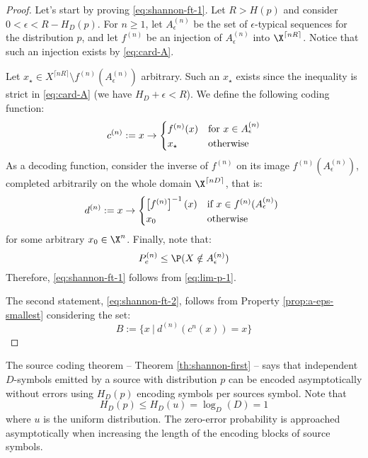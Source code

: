 \documentclass[toc]{../cs-classes/cs-classes}
\begin{document}
\begin{proof}
    Let's start by proving \eqref{eq:shannon-ft-1}. Let $R>H(p)$ and consider $0<\epsilon<R-H_D(p)$. For $n\geq1$, let $A_\epsilon^{(n)}$ be the set of $\epsilon$-typical sequences for the distribution $p$, and let $f^{(n)}$ be an injection of $A_\epsilon^{(n)}$ into $\X^{\lceil nR\rceil}$. Notice that such an injection exists by \eqref{eq:card-A}.

    Let $x_\star\in X^{\lceil nR\rceil}\setminus f^{(n)}(A_\epsilon^{(n)})$ arbitrary. Such an $x_\star$ exists since the inequality is strict in \eqref{eq:card-A} (we have $H_D+\epsilon<R$). We define the following coding function:
    \begin{equation*}
        c^{(n)}:=x\to \begin{cases*}
            f^{(n)}(x) & for $x\in A_\epsilon^{(n)}$\\
            x_\star & otherwise
        \end{cases*}
    \end{equation*}
    As a decoding function, consider the inverse of $f^{(n)}$ on its image $f^{(n)}(A_\epsilon^{(n)})$, completed arbitrarily on the whole domain $\X^{\lceil nD\rceil}$, that is:
    \begin{equation*}
        d^{(n)}:=x\to\begin{cases*}
            \left[f^{(n)}\right]^{-1}(x) & if $x\in f^{(n)}(A_\epsilon^{(n)})$ \\
            x_0 & otherwise
        \end{cases*}
    \end{equation*}
    for some arbitrary $x_0\in \X^n$. Finally, note that:
    \begin{equation*}
        P_e^{(n)}\leq \P(X\notin A_\epsilon^{(n)})
    \end{equation*}
    Therefore, \eqref{eq:shannon-ft-1} follows from \eqref{eq:lim-p-1}.

    The second statement, \eqref{eq:shannon-ft-2}, follows from Property \ref{prop:a-eps-smallest} considering the set:
    \begin{equation*}
        B:=\{x \:|\: d^{(n)}\left(c^{n}(x)\right) = x\}
    \end{equation*}
\end{proof}

\begin{remark}
    The source coding theorem -- Theorem \ref{th:shannon-first} -- says that independent $D$-symbols emitted by a source with distribution $p$ can be encoded asymptotically without errors using $H_D(p)$ encoding symbols per sources symbol. Note that
    \begin{equation*}
        H_D(p)\leq H_D(u)=\log_D(D)=1
    \end{equation*}
    where $u$ is the uniform distribution. The zero-error probability is approached asymptotically when increasing the length of the encoding blocks of source symbols.
\end{remark}
\end{document}
